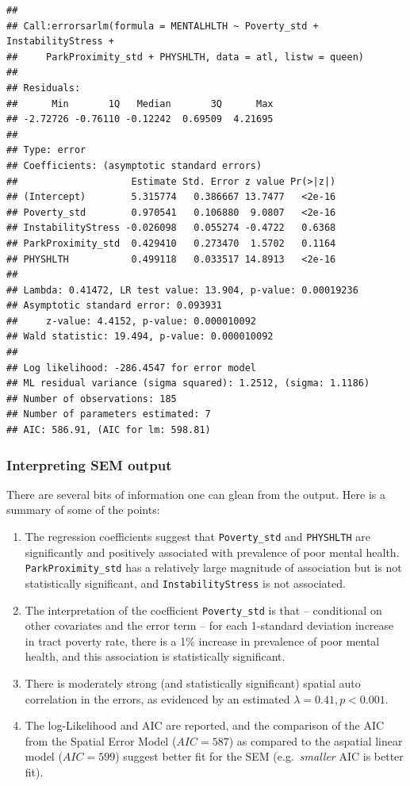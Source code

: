 \documentclass[
]{book}
\providecommand{\tightlist}{%
  \setlength{\itemsep}{0pt}\setlength{\parskip}{0pt}}
\begin{document}
\begin{verbatim}
## 
## Call:errorsarlm(formula = MENTALHLTH ~ Poverty_std + InstabilityStress + 
##     ParkProximity_std + PHYSHLTH, data = atl, listw = queen)
## 
## Residuals:
##      Min       1Q   Median       3Q      Max 
## -2.72726 -0.76110 -0.12242  0.69509  4.21695 
## 
## Type: error 
## Coefficients: (asymptotic standard errors) 
##                    Estimate Std. Error z value Pr(>|z|)
## (Intercept)        5.315774   0.386667 13.7477   <2e-16
## Poverty_std        0.970541   0.106880  9.0807   <2e-16
## InstabilityStress -0.026098   0.055274 -0.4722   0.6368
## ParkProximity_std  0.429410   0.273470  1.5702   0.1164
## PHYSHLTH           0.499118   0.033517 14.8913   <2e-16
## 
## Lambda: 0.41472, LR test value: 13.904, p-value: 0.00019236
## Asymptotic standard error: 0.093931
##     z-value: 4.4152, p-value: 0.000010092
## Wald statistic: 19.494, p-value: 0.000010092
## 
## Log likelihood: -286.4547 for error model
## ML residual variance (sigma squared): 1.2512, (sigma: 1.1186)
## Number of observations: 185 
## Number of parameters estimated: 7 
## AIC: 586.91, (AIC for lm: 598.81)
\end{verbatim}

\hypertarget{interpreting-sem-output}{%
\subsubsection{Interpreting SEM output}\label{interpreting-sem-output}}

There are several bits of information one can glean from the output. Here is a summary of some of the points:

\begin{enumerate}
\def\labelenumi{\arabic{enumi}.}
\tightlist
\item
  The regression coefficients suggest that \texttt{Poverty\_std} and \texttt{PHYSHLTH} are significantly and positively associated with prevalence of poor mental health. \texttt{ParkProximity\_std} has a relatively large magnitude of association but is not statistically significant, and \texttt{InstabilityStress} is not associated.
\item
  The interpretation of the coefficient \texttt{Poverty\_std} is that -- conditional on other covariates and the error term -- for each 1-standard deviation increase in tract poverty rate, there is a 1\% increase in prevalence of poor mental health, and this association is statistically significant.
\item
  There is moderately strong (and statistically significant) spatial auto correlation in the errors, as evidenced by an estimated \(\lambda=0.41, p < 0.001\).
\item
  The log-Likelihood and AIC are reported, and the comparison of the AIC from the Spatial Error Model (\(AIC=587\)) as compared to the aspatial linear model (\(AIC=599\)) suggest better fit for the SEM (e.g.~\emph{smaller} AIC is better fit).
\end{enumerate}
\end{document}
